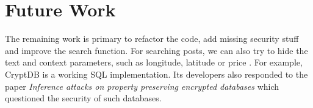 \documentclass{scrartcl}
\begin{document}
\section{Future Work}
The remaining work is primary to refactor the code, add missing security stuff and improve the search function.
For searching posts, we can also try to hide the text and context  parameters, such as longitude, latitude or price . For example,  CryptDB \cite{cryptdb} is a working SQL implementation. Its developers also responded to the paper  \emph{Inference attacks on property preserving encrypted databases} \cite{INF} which questioned the security of such databases.
%
%
%
\end{document}
